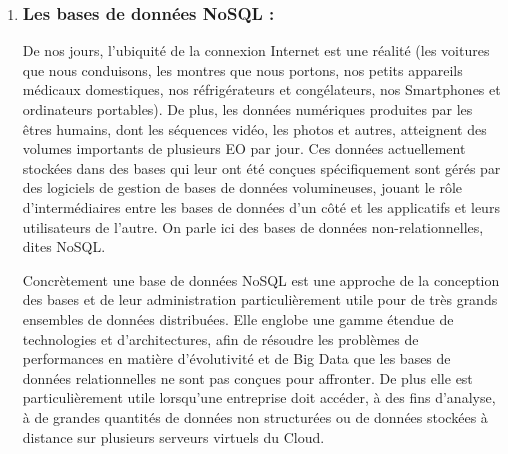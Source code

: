 \begin{enumerate}
\begin{itemize}
\end{itemize}

\item \subsubsection{Les bases de données NoSQL :}
De nos jours, l'ubiquité de la connexion Internet est une réalité (les voitures que nous conduisons, les montres que nous portons, nos petits appareils médicaux domestiques, nos réfrigérateurs et congélateurs, nos Smartphones et ordinateurs portables). De plus, les données numériques produites par les êtres humains, dont les séquences vidéo, les photos et autres, atteignent des volumes importants de plusieurs EO par jour. Ces données actuellement stockées dans des bases qui leur ont été conçues spécifiquement sont gérés par des logiciels de gestion de bases de données volumineuses, jouant le rôle d'intermédiaires entre les bases de données d'un côté et les applicatifs et leurs utilisateurs de l'autre. On parle ici des bases de données non-relationnelles, dites NoSQL. 

Concrètement une base de données NoSQL est une approche de la conception des bases et de leur administration particulièrement utile pour de très grands ensembles de données distribuées. Elle englobe une gamme étendue de technologies et d'architectures, afin de résoudre les problèmes de performances en matière d'évolutivité et de Big Data que les bases de données relationnelles ne sont pas conçues pour affronter. De plus elle est particulièrement utile lorsqu'une entreprise doit accéder, à des fins d'analyse, à de grandes quantités de données non structurées ou de données stockées à distance sur plusieurs serveurs virtuels du Cloud.

\end{enumerate}

